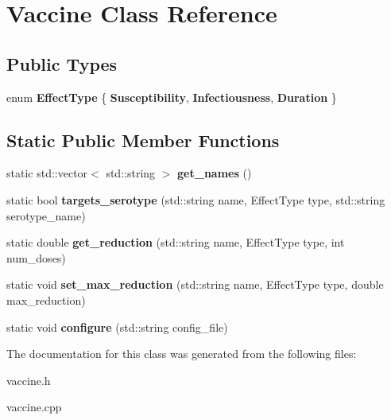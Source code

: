 \hypertarget{class_vaccine}{}\section{Vaccine Class Reference}
\label{class_vaccine}
\subsection*{Public Types}
\begin{DoxyCompactItemize}
\item 
\mbox{\label{class_vaccine_adfa2c28ffc6235a12af80b9b85bb6db7}} 
enum {\bfseries Effect\+Type} \{ {\bfseries Susceptibility}, 
{\bfseries Infectiousness}, 
{\bfseries Duration}
 \}
\end{DoxyCompactItemize}
\subsection*{Static Public Member Functions}
\begin{DoxyCompactItemize}
\item 
\mbox{\label{class_vaccine_ab56911f72aefbdf4c57e7fb7065757e9}} 
static std\+::vector$<$ std\+::string $>$ {\bfseries get\+\_\+names} ()
\item 
\mbox{\label{class_vaccine_a345f231eaf3cc16f19e77594432c215b}} 
static bool {\bfseries targets\+\_\+serotype} (std\+::string name, Effect\+Type type, std\+::string serotype\+\_\+name)
\item 
\mbox{\label{class_vaccine_a47b11de0ede15030839eb4e8c37363ca}} 
static double {\bfseries get\+\_\+reduction} (std\+::string name, Effect\+Type type, int num\+\_\+doses)
\item 
\mbox{\label{class_vaccine_a73fab01c5099698a98494dfa9d01e3c3}} 
static void {\bfseries set\+\_\+max\+\_\+reduction} (std\+::string name, Effect\+Type type, double max\+\_\+reduction)
\item 
\mbox{\label{class_vaccine_a40a0c7acd6f4f01b35e02016c4c9ae0f}} 
static void {\bfseries configure} (std\+::string config\+\_\+file)
\end{DoxyCompactItemize}


The documentation for this class was generated from the following files\+:\begin{DoxyCompactItemize}
\item 
vaccine.\+h\item 
vaccine.\+cpp\end{DoxyCompactItemize}

